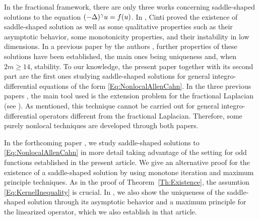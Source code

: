 In the fractional framework, there are only three works concerning saddle-shaped solutions to the equation $(-\Delta)^\gamma u = f(u)$. In \cite{Cinti-Saddle,Cinti-Saddle2}, Cinti proved the existence of saddle-shaped solution as well as some qualitative properties such as their asymptotic behavior, some monotonicity properties, and their instability in low dimensions. In a previous paper by the authors \cite{Felipe-Sanz-Perela:SaddleFractional}, further properties of these solutions have been established, the main ones being uniqueness and, when $2m\geq 14$, stability. To our knowledge, the present paper together with its second part \cite{FelipeSanz-Perela:IntegroDifferentialII} are the first ones studying saddle-shaped solutions for general integro-differential equations of the form \eqref{Eq:NonlocalAllenCahn}. In the three previous papers \cite{Cinti-Saddle, Cinti-Saddle2, Felipe-Sanz-Perela:SaddleFractional}, the main tool used is the extension problem for the fractional Laplacian (see \cite{CaffarelliSilvestre}). As mentioned, this technique cannot be carried out for general integro-differential operators different from the fractional Laplacian. Therefore, some purely nonlocal techniques are developed through both papers.

In the forthcoming paper \cite{FelipeSanz-Perela:IntegroDifferentialII}, we study saddle-shaped solutions to \eqref{Eq:NonlocalAllenCahn} in more detail taking advantage of the setting for odd functions established in the present article. We give an alternative proof for the existence of a saddle-shaped solution by using monotone iteration and maximum principle techniques. As in the proof of Theorem~\ref{Th:Existence}, the assumtion \eqref{Eq:KernelInequality} is crucial. In \cite{FelipeSanz-Perela:IntegroDifferentialII}, we also show the uniqueness of the saddle-shaped solution through its asymptotic behavior and a maximum principle for the linearized operator, which we also establish in that article.

